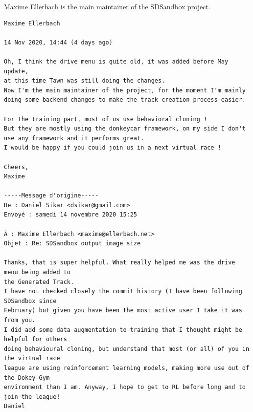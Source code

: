 Maxime Ellerbach is the main maintainer of the SDSandbox project. 

\begin{verbatim}
Maxime Ellerbach
	
14 Nov 2020, 14:44 (4 days ago)
	
Oh, I think the drive menu is quite old, it was added before May update,
at this time Tawn was still doing the changes.
Now I'm the main maintainer of the project, for the moment I'm mainly
doing some backend changes to make the track creation process easier.

For the training part, most of us use behavioral cloning !
But they are mostly using the donkeycar framework, on my side I don't
use any framework and it performs great.
I would be happy if you could join us in a next virtual race !

Cheers,
Maxime

-----Message d'origine-----
De : Daniel Sikar <dsikar@gmail.com>
Envoyé : samedi 14 novembre 2020 15:25

À : Maxime Ellerbach <maxime@ellerbach.net>
Objet : Re: SDSandbox output image size

Thanks, that is super helpful. What really helped me was the drive menu being added to
the Generated Track.
I have not checked closely the commit history (I have been following SDSandbox since
February) but given you have been the most active user I take it was from you.
I did add some data augmentation to training that I thought might be helpful for others
doing behavioural cloning, but understand that most (or all) of you in the virtual race
league are using reinforcement learning models, making more use out of the Dokey-Gym
environment than I am. Anyway, I hope to get to RL before long and to join the league!
Daniel

\end{verbatim}

